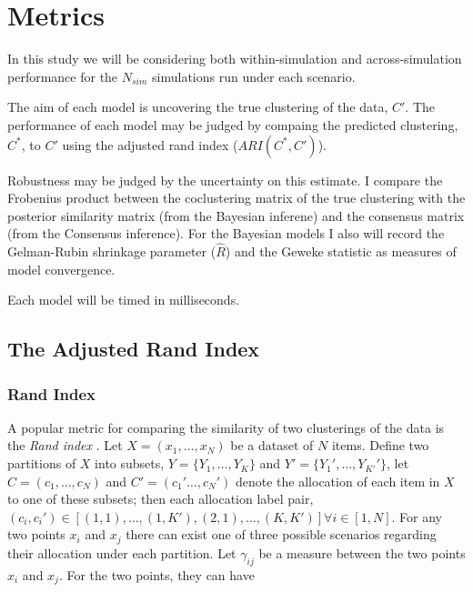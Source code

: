 \documentclass[
]{book}
\begin{document}
\hypertarget{metrics}{%
\chapter{Metrics}\label{metrics}}

In this study we will be considering both within-simulation and across-simulation performance for the \(N_{sim}\) simulations run under each scenario.

The aim of each model is uncovering the true clustering of the data, \(C'\). The performance of each model may be judged by compaing the predicted clustering, \(C^*\), to \(C'\) using the adjusted rand index (\textbf{\({ARI(C^*, C')}\)}).

Robustness may be judged by the uncertainty on this estimate. I compare the Frobenius product between the coclustering matrix of the true clustering with the posterior similarity matrix (from the Bayesian inferene) and the consensus matrix (from the Consensus inference). For the Bayesian models I also will record the Gelman-Rubin shrinkage parameter (\(\hat{R}\)) and the Geweke statistic as measures of model convergence.

Each model will be timed in milliseconds.

\hypertarget{the-adjusted-rand-index}{%
\section{The Adjusted Rand Index}\label{the-adjusted-rand-index}}

\hypertarget{rand-index}{%
\subsection{Rand Index}\label{rand-index}}

A popular metric for comparing the similarity of two clusterings of the data is the \emph{Rand index} \citep{rand1971objective}. Let \(X=(x_1,\ldots,x_N)\) be a dataset of \(N\) items. Define two partitions of \(X\) into subsets, \(Y=\{Y_1,\ldots,Y_K\}\) and \(Y'=\{Y_1',\ldots, Y_{K'}'\}\), let \(C=(c_1,\ldots,c_N)\) and \(C'=(c_1'\ldots,c_N')\) denote the allocation of each item in \(X\) to one of these subsets; then each allocation label pair, \((c_i, c_i') \in [(1, 1),\ldots, (1, K'), (2, 1), \ldots, (K, K')] \forall i \in [1, N]\). For any two points \(x_i\) and \(x_j\) there can exist one of three possible scenarios regarding their allocation under each partition. Let \(\gamma_{ij}\) be a measure between the two points \(x_i\) and \(x_j\). For the two points, they can have
\end{document}
